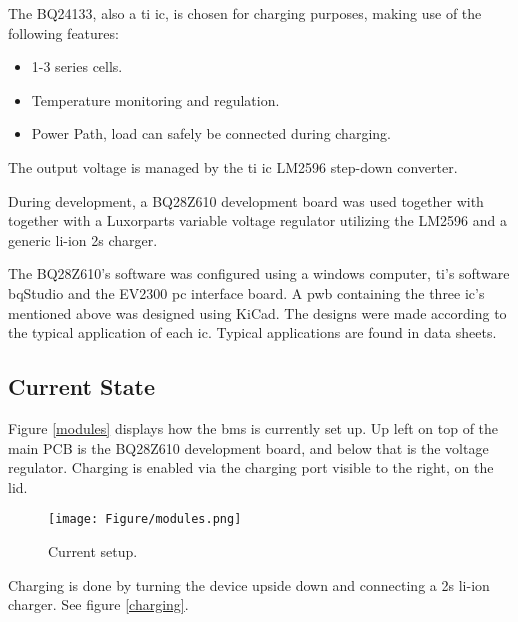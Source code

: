 The BQ24133, also a \gls{ti} \gls{ic}, is chosen for charging purposes, making use of the following features:

\begin{itemize}
\item 1-3 series cells.
\item Temperature monitoring and regulation.
\item Power Path, load can safely be connected during charging.
\end{itemize}

The output voltage is managed by the \gls{ti} \gls{ic} LM2596 step-down converter.

During development, a BQ28Z610 development board was used together with together with a Luxorparts variable voltage regulator utilizing the LM2596 and a generic \gls{li-ion} \gls{2s} charger.

The BQ28Z610’s software was configured using a windows computer, \gls{ti}’s software bqStudio and the EV2300 \gls{pc} interface board.
A \gls{pwb} containing the three \gls{ic}’s mentioned above was designed using KiCad. The designs were made according to the typical application of each \gls{ic}. Typical applications are found in data sheets.  

\subsection{Current State}

Figure \autoref{modules} displays how the \gls{bms} is currently set up. Up left on top of the main PCB is the BQ28Z610 development board, and below that is the voltage regulator. Charging is enabled via the charging port visible to the right, on the lid.

\begin{figure}[H]
\centering
\texttt{[image: Figure/modules.png]}
\caption{Current setup.}
\label{modules}
\end{figure}


Charging is done by turning the device upside down and connecting a \gls{2s} \gls{li-ion} charger. See figure \autoref{charging}.

